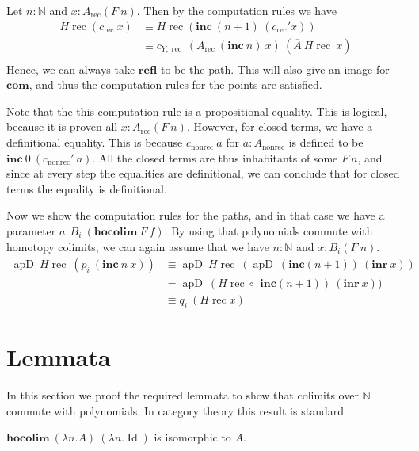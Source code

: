 \documentclass[a4paper,UKenglish]{lipics-v2016}
\newcommand{\Boperator}[1]{\mathrm{\mathbf{#1}}}
\newcommand{\comp}[0]{\circ \,}
\newcommand{\frec}[0]{\!\operatorname{rec}}
\newcommand{\rec}[0]{\operatorname{rec}}
\newcommand{\nonrec}[0]{\operatorname{nonrec}}
\newcommand{\apd}[0]{\operatorname{apD}}
\newcommand{\refl}[0]{\Boperator{refl}}
\newcommand{\hocolim}[0]{\Boperator{hocolim}}
\newcommand{\inr}[0]{\Boperator{inr}}
\newcommand{\inc}[0]{\Boperator{inc}}
\newcommand{\com}[0]{\Boperator{com}}
\begin{document}
Let $n : \mathbb{N}$ and $x : A_{\rec}(F \> n)$.
Then by the computation rules we have
\begin{equation*}
\begin{split}
H\frec(c_{\rec} \> x) 
&\equiv H\frec(\inc \> (n+1) \> (c_{\rec}' x)) \\
&\equiv c_{Y,\rec} \> (A_{\rec} \> (\inc \> n) \> x) \> (\overline{A} \> H\frec \> x)\\
\end{split}
\end{equation*}
Hence, we can always take $\refl$ to be the path.
This will also give an image for $\com$, and thus the computation rules for the points are satisfied.

Note that the this computation rule is a propositional equality.
This is logical, because it is proven all $x : A_{\rec}(F \> n)$.
However, for closed terms, we have a definitional equality.
This is because $c_{\nonrec} \> a$ for $a : A_{\nonrec}$ is defined to be$\inc \> 0 \> (c_{\nonrec}' \> a)$.
All the closed terms are thus inhabitants of some $F \> n$, and since at every step the equalities are definitional, we can conclude that for closed terms the equality is definitional.

Now we show the computation rules for the paths, and in that case we have a parameter $a : B_i \> (\hocolim \> F \> f)$.
By using that polynomials commute with homotopy colimits, we can again assume that we have $n : \mathbb{N}$ and $x : B_i(F \> n)$.
\begin{equation*}
\begin{split}
\apd \> H\frec \> (p_i \> (\inc \> n \> x))
&\equiv \apd \> H\frec \> (\apd \> (\inc (n+1)) \> (\inr \> x))\\
&= \apd \> (H\frec \comp  \> \inc (n+1)) \> (\inr \> x))\\
&\equiv q_i \> (H\frec x)
\end{split}
\end{equation*}


\section{Lemmata}
\label{sec:Lemmata}
In this section we proof the required lemmata to show that colimits over $\mathbb{N}$ commute with polynomials.
In category theory this result is standard \cite{mac2013categories}.

\begin{lemma}
\label{lem:colimcon}
$\hocolim \> (\lambda n . A) \> (\lambda n . \operatorname{Id})$ is isomorphic to $A$.
\end{lemma}
\end{document}
